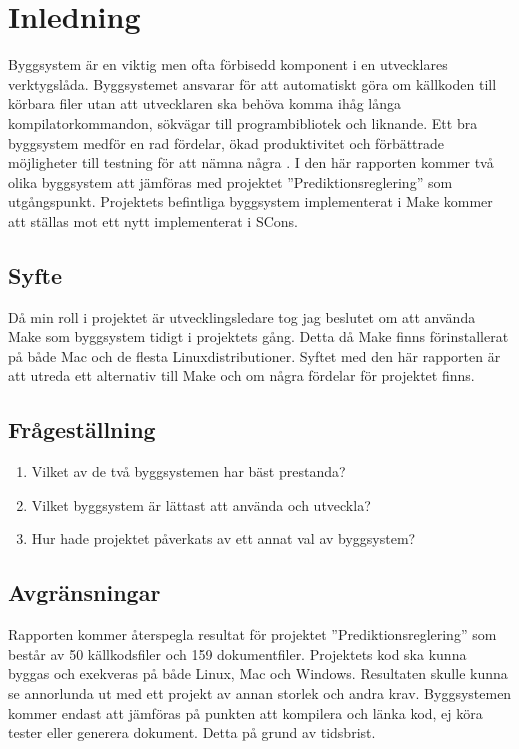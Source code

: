 \section{Inledning}
Byggsystem är en viktig men ofta förbisedd komponent i en utvecklares verktygslåda. Byggsystemet ansvarar för att automatiskt göra om källkoden till körbara filer utan att utvecklaren ska behöva komma ihåg långa kompilatorkommandon, sökvägar till programbibliotek och liknande. Ett bra byggsystem medför en rad fördelar, ökad produktivitet och förbättrade möjligheter till testning för att nämna några \citep{pragmaticautomation}.
\newline
\newline
I den här rapporten kommer två olika byggsystem att jämföras med projektet ''Prediktionsreglering'' som utgångspunkt. Projektets befintliga byggsystem implementerat i Make kommer att ställas mot ett nytt implementerat i SCons. 

\subsection{Syfte}
Då min roll i projektet är utvecklingsledare tog jag beslutet om att använda Make som byggsystem tidigt i projektets gång. Detta då Make finns förinstallerat på både Mac och de flesta Linuxdistributioner. Syftet med den här rapporten är att utreda ett alternativ till Make och om några fördelar för projektet finns.

\subsection{Frågeställning} \label{avsnitt:fragestallning}

\begin{enumerate}
\item Vilket av de två byggsystemen har bäst prestanda?
\item Vilket byggsystem är lättast att använda och utveckla?
\item Hur hade projektet påverkats av ett annat val av byggsystem?
\end{enumerate}

\subsection{Avgränsningar} \label{avsnitt:avgransningar}
Rapporten kommer återspegla resultat för projektet ''Prediktionsreglering'' som består av 50 källkodsfiler och 159 dokumentfiler. Projektets kod ska kunna byggas och exekveras på både Linux, Mac och Windows. Resultaten skulle kunna se annorlunda ut med ett projekt av annan storlek och andra krav. Byggsystemen kommer endast att jämföras på punkten att kompilera och länka kod, ej köra tester eller generera dokument. Detta på grund av tidsbrist.
